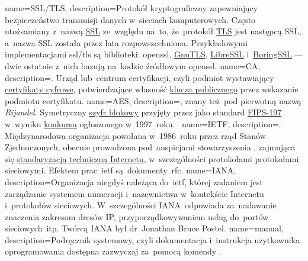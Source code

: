 {
	name={SSL/TLS},
	description={Protokół kryptograficzny zapewniający bezpieczeństwo transmisji danych w~sieciach komputerowych. Często utożsamiany z~nazwą \href{https://en.wikipedia.org/wiki/Secure_Sockets_Layer}{SSL} ze~względu na~to, że~protokół \href{https://en.wikipedia.org/wiki/Secure_Sockets_Layer}{TLS} jest następcą SSL, a~nazwa SSL została przez lata rozpowszechniona. Przykładowymi implementacjami \gls{ssl/tls} są biblioteki: \gls{openssl}, \href{https://en.wikipedia.org/wiki/GnuTLS}{GnuTLS}, \href{https://en.wikipedia.org/wiki/LibreSSL}{LibreSSL} i~\href{https://boringssl.googlesource.com/boringssl/}{BoringSSL} --- dwie ostatnie z~nich bazują na~kodzie źródłowym \gls{openssl}.}
}
{
	name={CA},
	description={. Urząd lub~centrum certyfikacji, czyli podmiot wystawiający \href{https://en.wikipedia.org/wiki/Public_key_certificate}{certyfikaty cyfrowe}, potwierdzające własność \href{https://en.wikipedia.org/wiki/Public-key_cryptography}{klucza publicznego} przez wskazanie podmiotu certyfikatu.}
}
{
	name={AES},
	description={, znany też~pod pierwotną nazwą \emph{Rijandel}. Symetryczny \href{https://en.wikipedia.org/wiki/Block_cipher}{szyfr blokowy} przyjęty przez  jako standard \href{http://nvlpubs.nist.gov/nistpubs/FIPS/NIST.FIPS.197.pdf}{FIPS-197} w~wyniku \href{https://en.wikipedia.org/wiki/Advanced_Encryption_Standard_process}{konkursu} ogłoszonego w~1997~roku.~\cite{aes-fips197}}
}
{
	name={IETF},
	description={. Międzynarodowa organizacja powołana w~1986~roku przez rząd Stanów Zjednoczonych, obecnie prowadzona pod~auspicjami stowarzyszenia , zajmująca się \href{https://en.wikipedia.org/wiki/Internet_Standard}{standaryzacją techniczną Internetu}, w~szczególności protokołami protokołami sieciowymi. Efektem prac~\gls{ietf} są~dokumenty~\gls{rfc}.}
}
{
	name={IANA},
	description={Organizacja niegdyś należąca do~\gls{ietf}, której zadaniem jest zarządzanie systemem numeracji i~nazewnictwa w~kontekście Internetu i~protokołów sieciowych. W~szczególności IANA~odpowiada za~nadawanie znaczenia zakresom dresów IP, przyporządkowywaniem usług do~portów sieciowych~itp. Twórcą IANA był dr~Jonathan Bruce Postel.}
}
{
	name={manual},
	description={Podręcznik systemowy, czyli dokumentacja i~instrukcja użytkownika oprogramowania dostępna zazwyczaj za~pomocą komendy .}
}
